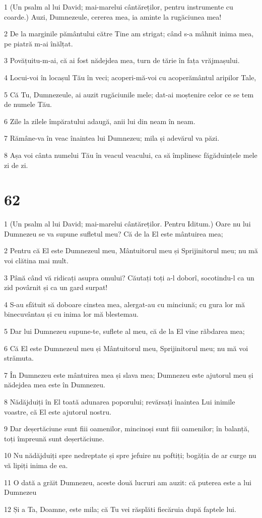 \par 1 (Un psalm al lui David; mai-marelui cântăreților, pentru instrumente cu coarde.) Auzi, Dumnezeule, cererea mea, ia aminte la rugăciunea mea!
\par 2 De la marginile pământului către Tine am strigat; când s-a mâhnit inima mea, pe piatră m-ai înălțat.
\par 3 Povățuitu-m-ai, că ai fost nădejdea mea, turn de tărie în fața vrăjmașului.
\par 4 Locui-voi în locașul Tău în veci; acoperi-mă-voi cu acoperământul aripilor Tale,
\par 5 Că Tu, Dumnezeule, ai auzit rugăciunile mele; dat-ai moștenire celor ce se tem de numele Tău.
\par 6 Zile la zilele împăratului adaugă, anii lui din neam în neam.
\par 7 Rămâne-va în veac înaintea lui Dumnezeu; mila și adevărul va păzi.
\par 8 Așa voi cânta numelui Tău în veacul veacului, ca să împlinesc făgăduințele mele zi de zi.

\chapter{62}

\par 1 (Un psalm al lui David; mai-marelui cântăreților. Pentru Iditum.) Oare nu lui Dumnezeu se va supune sufletul meu? Că de la El este mântuirea mea;
\par 2 Pentru că El este Dumnezeul meu, Mântuitorul meu și Sprijinitorul meu; nu mă voi clătina mai mult.
\par 3 Până când vă ridicați asupra omului? Căutați toți a-l doborî, socotindu-l ca un zid povârnit și ca un gard surpat!
\par 4 S-au sfătuit să doboare cinstea mea, alergat-au cu minciună; cu gura lor mă binecuvântau și cu inima lor mă blestemau.
\par 5 Dar lui Dumnezeu supune-te, suflete al meu, că de la El vine răbdarea mea;
\par 6 Că El este Dumnezeul meu și Mântuitorul meu, Sprijinitorul meu; nu mă voi strămuta.
\par 7 În Dumnezeu este mântuirea mea și slava mea; Dumnezeu este ajutorul meu și nădejdea mea este în Dumnezeu.
\par 8 Nădăjduiți în El toată adunarea poporului; revărsați înaintea Lui inimile voastre, că El este ajutorul nostru.
\par 9 Dar deșertăciune sunt fiii oamenilor, mincinoși sunt fiii oamenilor; în balanță, toți împreună sunt deșertăciune.
\par 10 Nu nădăjduiți spre nedreptate și spre jefuire nu poftiți; bogăția de ar curge nu vă lipiți inima de ea.
\par 11 O dată a grăit Dumnezeu, aceste două lucruri am auzit: că puterea este a lui Dumnezeu
\par 12 Și a Ta, Doamne, este mila; că Tu vei răsplăti fiecăruia după faptele lui.

